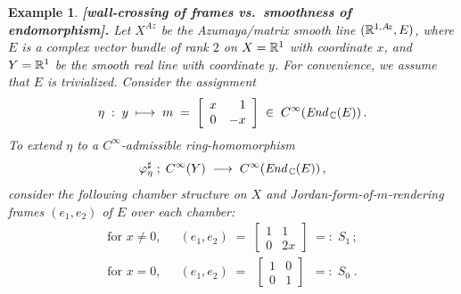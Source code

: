\documentclass[11pt]{article}
\numberwithin{equation}{subsection}
\newtheorem{sexample}[stheorem]{Example}
\newcommand{\End}{\mbox{\it End}\,}
\begin{document}
\begin{sexample} {\bf [wall-crossing of frames vs.\ smoothness of endomorphism].} \rm
 Let
  $X^{\!A\!z}$ be the Azumaya/matrix smooth line $({\Bbb R}^{1,A\!z},E)$,
    where $E$ is a complex vector bundle of rank $2$ on $X={\Bbb R}^1$ with coordinate $x$, and     
  $Y={\Bbb R}^1$ be the smooth real line with coordinate $y$.
 For convenience, we assume that $E$ is trivialized.
 Consider the assignment
  $$
    \eta\;:\; y\; \longmapsto\;
	  m\; =\; \left[ \begin{array}{cc} x & \;\;\;1 \\ 0 & -x    \end{array} \right]\;
	                  \in\; C^{\infty}(\End_{\Bbb C}(E))\,.
  $$
 {To} extend $\eta$ to a $C^{\infty}$-admissible ring-homomorphism
  $$
     \varphi_{\eta}^{\sharp}\; ;\;
	   C^{\infty}(Y)\; \longrightarrow\;
	   C^{\infty}(\End_{\Bbb C}(E))\,,
  $$
  consider the following chamber structure on $X$ and
  Jordan-form-of-$m$-rendering frames $(e_1,e_2)$ of $E$ over each chamber:
  $$
  \begin{array}{lcl}
    \mbox{for $x\ne 0$,}
	  &&  (e_1,e_2)\;=\;
	            \left[\begin{array}{cc} 1 & 1 \\ 0 & 2x   \end{array}  \right]\; =:\; S_1\,; \\[3.6ex]
    \mbox{for $x=0$,}
      &&  (e_1,e_2)\;=\;
	            \;\left[\begin{array}{cc} 1 & 0 \\ 0 & 1     \end{array}  \right]\;\; =:\; S_0\; .
  \end{array}
  $$


\end{sexample}
\end{document}
